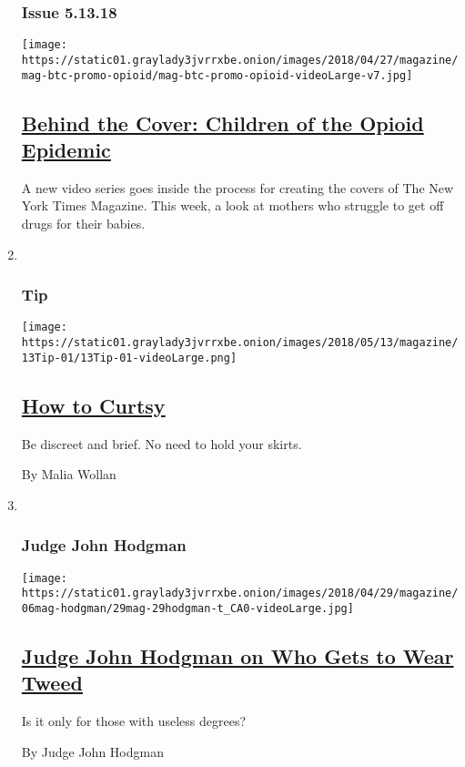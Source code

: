\begin{enumerate}
{  \subsubsection{Issue 5.13.18}\label{issue-51318}}

  \texttt{[image: https://static01.graylady3jvrrxbe.onion/images/2018/04/27/magazine/mag-btc-promo-opioid/mag-btc-promo-opioid-videoLarge-v7.jpg]}

  \hypertarget{behind-the-cover-children-of-the-opioid-epidemic}{%
  \subsection{\texorpdfstring{\href{/2018/05/09/magazine/behind-the-cover-children-of-the-opioid-epidemic.html}{Behind
  the Cover: Children of the Opioid
  Epidemic}}{Behind the Cover: Children of the Opioid Epidemic}}\label{behind-the-cover-children-of-the-opioid-epidemic}}

  A new video series goes inside the process for creating the covers of
  The New York Times Magazine. This week, a look at mothers who struggle
  to get off drugs for their babies.
\item ~
  \hypertarget{tip}{%
  \subsubsection{Tip}\label{tip}}

  \texttt{[image: https://static01.graylady3jvrrxbe.onion/images/2018/05/13/magazine/13Tip-01/13Tip-01-videoLarge.png]}

  \hypertarget{how-to-curtsy}{%
  \subsection{\texorpdfstring{\href{/2018/05/09/magazine/how-to-curtsy.html}{How
  to Curtsy}}{How to Curtsy}}\label{how-to-curtsy}}

  Be discreet and brief. No need to hold your skirts.

  By Malia Wollan
\item ~
  \hypertarget{judge-john-hodgman}{%
  \subsubsection{Judge John Hodgman}\label{judge-john-hodgman}}

  \texttt{[image: https://static01.graylady3jvrrxbe.onion/images/2018/04/29/magazine/06mag-hodgman/29mag-29hodgman-t\_CA0-videoLarge.jpg]}

  \hypertarget{judge-john-hodgman-on-who-gets-to-wear-tweed}{%
  \subsection{\texorpdfstring{\href{/2018/05/10/magazine/judge-john-hodgman-on-who-gets-to-wear-tweed.html}{Judge
  John Hodgman on Who Gets to Wear
  Tweed}}{Judge John Hodgman on Who Gets to Wear Tweed}}\label{judge-john-hodgman-on-who-gets-to-wear-tweed}}

  Is it only for those with useless degrees?

  By Judge John Hodgman
\end{enumerate}

